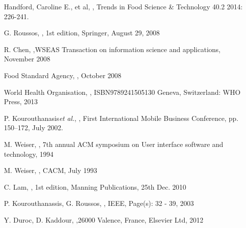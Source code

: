 \documentclass[a4paper, 11pt]{article}
\begin{document}
\begin{thebibliography}{29}
Handford, Caroline E., et al, \emph{}, Trends in Food Science \& Technology 40.2 2014: 226-241.
\vspace{\baselineskip}

G. Roussos, \emph{}, 1st edition, Springer, August 29, 2008
\vspace{\baselineskip}

 R. Chen, \emph{},WSEAS Transaction on information science and applications, November 2008
\vspace{\baselineskip}

Food Standard Agency, \emph{}, October 2008
\vspace{\baselineskip}

World Health Organisation, \emph{}, ISBN9789241505130 Geneva, Switzerland: WHO Press, 2013
\vspace{\baselineskip}

P. Kourouthanasis\emph{et al.}, \emph{}, First International Mobile Business Conference, pp. 150--172, July 2002.
\vspace{\baselineskip}

M. Weiser, \emph{}, 7th annual ACM symposium on User interface software and technology, 1994

M. Weiser, \emph{}, CACM, July 1993
\vspace{\baselineskip}

C. Lam, \emph{}, 1st edition, Manning Publications, 25th Dec. 2010
\vspace{\baselineskip}

P. Kourouthanassis, G. Roussos, \emph{}, IEEE, Page(s): 32	- 39, 2003
\vspace{\baselineskip}

Y. Duroc, D. Kaddour, \emph{},26000 Valence, France, Elsevier Ltd, 2012
\vspace{\baselineskip}

\end{thebibliography}
\end{document}
